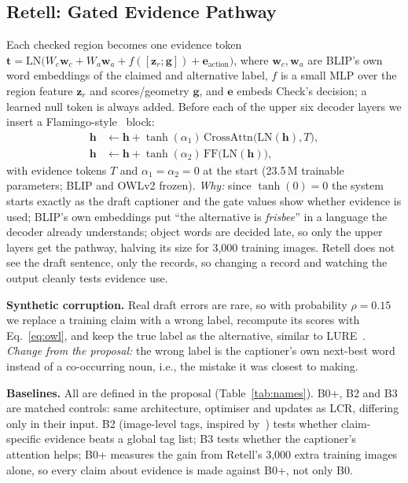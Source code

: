 \documentclass[conference]{IEEEtran}
\begin{document}
\subsection{Retell: Gated Evidence Pathway}
\label{sec:design-retell}
Each checked region becomes one evidence token
$\mathbf{t} = \mathrm{LN}\bigl(W_c\mathbf{w}_c + W_a\mathbf{w}_a + f([\mathbf{z}_r;\mathbf{g}]) +
\mathbf{e}_{\text{action}}\bigr)$, where $\mathbf{w}_c,\mathbf{w}_a$ are BLIP's own word embeddings of the
claimed and alternative label, $f$ is a small MLP over the region feature $\mathbf{z}_r$ and scores/geometry
$\mathbf{g}$, and $\mathbf{e}$ embeds Check's decision; a learned null token is always added. Before each of the
upper six decoder layers we insert a Flamingo-style~\cite{alayrac2022flamingo} block:
\begin{align*}
\mathbf{h} &\leftarrow \mathbf{h} + \tanh(\alpha_1)\,\mathrm{CrossAttn}\bigl(\mathrm{LN}(\mathbf{h}),
T\bigr),\\
\mathbf{h} &\leftarrow \mathbf{h} + \tanh(\alpha_2)\,\mathrm{FF}\bigl(\mathrm{LN}(\mathbf{h})\bigr),
\end{align*}
with evidence tokens $T$ and $\alpha_1=\alpha_2=0$ at the start (23.5\,M trainable parameters; BLIP and OWLv2
frozen). \emph{Why:} since $\tanh(0)=0$ the system starts exactly as the draft captioner and the gate values
show whether evidence is used; BLIP's own embeddings put ``the alternative is \emph{frisbee}'' in a language
the decoder already understands; object words are decided late, so only the upper layers get the pathway,
halving its size for 3,000 training images. Retell does not see the draft sentence, only the records, so
changing a record and watching the output cleanly tests evidence use.

\textbf{Synthetic corruption.} Real draft errors are rare, so with probability $\rho=0.15$ we replace a
training claim with a wrong label, recompute its scores with Eq.~\eqref{eq:owl}, and keep the true label as
the alternative, similar to LURE~\cite{zhou2024analyzing}. \emph{Change from the proposal:} the wrong label is
the captioner's own next-best word instead of a co-occurring noun, i.e., the mistake it was closest to making.

\textbf{Baselines.} All are defined in the proposal (Table~\ref{tab:names}). B0+, B2 and B3 are matched
controls: same architecture, optimiser and updates as LCR, differing only in their input. B2 (image-level tags,
inspired by~\cite{biten2022let}) tests whether claim-specific evidence beats a global tag list; B3 tests
whether the captioner's attention helps; B0+ measures the gain from Retell's 3,000 extra training images alone,
so every claim about evidence is made against B0+, not only B0.
\end{document}
